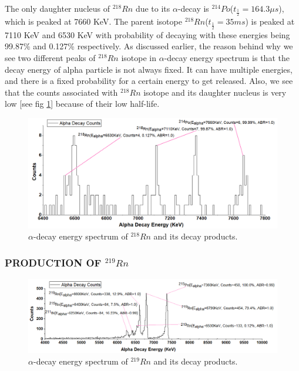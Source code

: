 \documentclass[12pt]{article}
\begin{document}
The only daughter nucleus of $^{218}Rn$ due to its $\alpha$-decay is $^{214}Po$($t_\frac{1}{2}=164.3 \mu s$), which is peaked at 7660 KeV. The parent isotope $^{218}Rn$($t_\frac{1}{2}=35 ms$) is peaked at 7110 KeV and 6530 KeV with probability of decaying with these energies being 99.87\% and 0.127\% respectively. As discussed earlier, the reason behind why we see two different peaks of $^{218}Rn$ isotope in $\alpha$-decay energy spectrum is that the decay energy of alpha particle is not always fixed. It can have multiple energies, and there is a fixed probability for a certain energy to get released. Also, we see that the counts associated with $^{218}Rn$ isotope and its daughter nucleus is very low [see fig \ref{alpha-decay energy spectrum of 218Rn and its decay products.}] because of their low half-life.

\begin{figure}[h]
\centering
\includegraphics[scale=0.5]{Rn218.png}
\caption{$\alpha$-decay energy spectrum of $^{218}Rn$ and its decay products.}
\label{alpha-decay energy spectrum of 218Rn and its decay products.}
\end{figure}



\subsubsection{PRODUCTION OF $^{219}Rn$}
\begin{figure}[h]
\centering
\includegraphics[scale=0.5]{Rn219.png}
\caption{$\alpha$-decay energy spectrum of $^{219}Rn$ and its decay products.}
\label{alpha-decay energy spectrum of 219Rn and its decay products.}
\end{figure}
\end{document}
